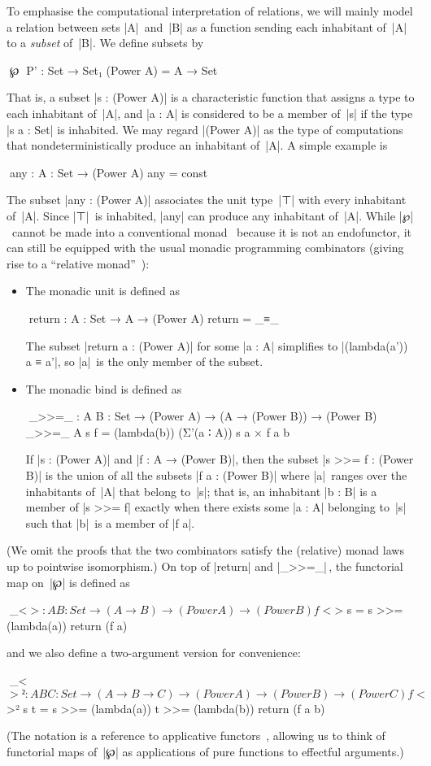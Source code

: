 To emphasise the computational interpretation of relations, we will mainly model a relation between sets |A|~and~|B| as a function sending each inhabitant of~|A| to a \emph{subset} of~|B|.
We define subsets by
\begin{code}
^^^℘ ^^^P' : Set → Set₁
(Power A) = A → Set
\end{code}
That is, a subset |s : (Power A)| is a characteristic function that assigns a type to each inhabitant of~|A|, and |a : A| is considered to be a member of~|s| if the type |s a : Set| is inhabited.
We may regard |(Power A)| as the type of computations that nondeterministically produce an inhabitant of~|A|.
A simple example is
\begin{code}
^^^any : {A : Set} → (Power A)
any = const ⊤
\end{code}
The subset |any : (Power A)| associates the unit type~|⊤| with every inhabitant of~|A|.
Since |⊤|~is inhabited, |any| can produce any inhabitant of~|A|.
While |℘|~cannot be made into a conventional monad~\citep{Moggi-monads, Wadler-essence} because it is not an endofunctor, it can still be equipped with the usual monadic programming combinators (giving rise to a ``relative monad''~\citep{Altenkirch-relative-monads}):
\begin{itemize}
\item The monadic unit is defined as
\begin{code}
^^^return : {A : Set} → A → (Power A)
return = _≡_
\end{code}
The subset |return a : (Power A)| for some |a : A| simplifies to |(lambda(a')) a ≡ a'|, so |a|~is the only member of the subset.
\item The monadic bind is defined as
\begin{code}
^^^_>>=_ : {A B : Set} → (Power A) → (A → (Power B)) → (Power B)
_>>=_ {A} s f = (lambda(b)) (Σ'(a ∶ A)) s a × f a b
\end{code}
If |s : (Power A)| and |f : A → (Power B)|, then the subset |s >>= f : (Power B)| is the union of all the subsets |f a : (Power B)| where |a|~ranges over the inhabitants of~|A| that belong to~|s|; that is, an inhabitant |b : B| is a member of |s >>= f| exactly when there exists some |a : A| belonging to~|s| such that |b|~is a member of |f a|.
\end{itemize}
(We omit the proofs that the two combinators satisfy the (relative) monad laws up to pointwise isomorphism.)
On top of |return| and |_>>=_|\,, the functorial map on~|℘| is defined as
\begin{code}
^^^_<$> : {A B : Set} → (A → B) → (Power A) → (Power B)
f <$> s = s >>= (lambda(a)) return (f a)
\end{code}
and we also define a two-argument version for convenience:
\begin{code}
^^^_<$>² : {A B C : Set} → (A → B → C) → (Power A) → (Power B) → (Power C)
f <$>² s t = s >>= (lambda(a)) t >>= (lambda(b)) return (f a b)
\end{code}
(The notation is a reference to applicative functors~\citep{McBride-Applicative}, allowing us to think of functorial maps of~|℘| as applications of pure functions to effectful arguments.)

